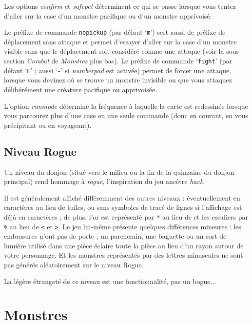 \documentclass[titlepage]{article}
\begin{document}
Les options
\textit{confirm}
et
\textit{safe\textunderscore pet}
déterminent ce qui se passe lorsque vous tentez d'aller sur la case d'un monstre
pacifique ou d'un monstre apprivoisé.

Le préfixe de commande \texttt{nopickup} (par défaut `\texttt{m}') sert
aussi de préfixe de déplacement sans attaque et permet d'essayer d'aller
sur la case d'un monstre visible sans que le déplacement soit considéré comme
une attaque (voir la sous-section \textit{Combat} de \textit{Monstres} plus bas).
Le préfixe de commande `\texttt{fight}' (par défaut `\texttt{F}' ;
aussi `\texttt{-}' si
\textit{number\textunderscore pad}
est activée) permet de forcer une attaque, lorsque vous devinez où se trouve
un monstre invisible ou que vous attaquez délibérément une créature pacifique
ou apprivoisée.

L'option
\textit{run\textunderscore mode}
détermine la fréquence à laquelle la carte est redessinée lorsque vous parcourez
plus d'une case en une seule commande (donc en courant, en vous précipitant ou en voyageant).

\subsection*{Niveau Rogue}

Un niveau du donjon (situé vers le milieu ou la fin de la quinzaine du donjon principal)
rend hommage à \textit{rogue}, l'inspiration du jeu ancêtre \textit{hack}.

Il est généralement affiché différemment des autres niveaux : éventuellement en
caractères au lieu de tuiles, ou sans symboles de tracé de lignes si l'affichage
est déjà en caractères ; de plus, l'or est représenté par \texttt{*} au lieu de \texttt{\textdollar}
et les escaliers par \texttt{\%} au lieu de \texttt{<} et \texttt{>}.
Le jeu lui-même présente quelques différences mineures : les embrasures n'ont pas
de porte ; un parchemin, une baguette ou un sort de lumière utilisé dans une pièce
éclaire toute la pièce au lieu d'un rayon autour de votre personnage.
Et les monstres représentés par des lettres minuscules ne sont pas générés
aléatoirement sur le niveau Rogue.

La légère étrangeté de ce niveau est une fonctionnalité, pas un bogue...

\section{Monstres}
\end{document}
